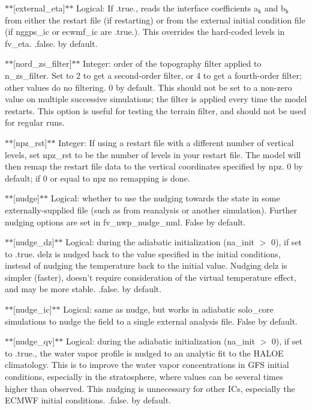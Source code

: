 $\ast$$\ast$\mbox{[}external\-\_\-eta\mbox{]}$\ast$$\ast$ Logical\-: If .true., reads the interface coefficients a$_{\mbox{k}}$  and b$_{\mbox{k}}$  from either the restart file (if restarting) or from the external initial condition file (if nggps\-\_\-ic or ecwmf\-\_\-ic are .true.). This overrides the hard-\/coded levels in fv\-\_\-eta. .false. by default.

$\ast$$\ast$\mbox{[}nord\-\_\-zs\-\_\-filter\mbox{]}$\ast$$\ast$ Integer\-: order of the topography filter applied to n\-\_\-zs\-\_\-filter. Set to 2 to get a second-\/order filter, or 4 to get a fourth-\/order filter; other values do no filtering. 0 by default. This should not be set to a non-\/zero value on multiple successive simulations; the filter is applied every time the model restarts. This option is useful for testing the terrain filter, and should not be used for regular runs.

$\ast$$\ast$\mbox{[}npz\-\_\-rst\mbox{]}$\ast$$\ast$ Integer\-: If using a restart file with a different number of vertical levels, set npz\-\_\-rst to be the number of levels in your restart file. The model will then remap the restart file data to the vertical coordinates specified by npz. 0 by default; if 0 or equal to npz no remapping is done.

$\ast$$\ast$\mbox{[}nudge\mbox{]}$\ast$$\ast$ Logical\-: whether to use the nudging towards the state in some externally-\/supplied file (such as from reanalysis or another simulation). Further nudging options are set in fv\-\_\-nwp\-\_\-nudge\-\_\-nml. False by default.

$\ast$$\ast$\mbox{[}nudge\-\_\-dz\mbox{]}$\ast$$\ast$ Logical\-: during the adiabatic initialization (na\-\_\-init $>$ 0), if set to .true. delz is nudged back to the value specified in the initial conditions, instead of nudging the temperature back to the initial value. Nudging delz is simpler (faster), doesn't require consideration of the virtual temperature effect, and may be more stable. .false. by default.

$\ast$$\ast$\mbox{[}nudge\-\_\-ic\mbox{]}$\ast$$\ast$ Logical\-: same as nudge, but works in adiabatic solo\-\_\-core simulations to nudge the field to a single external analysis file. False by default.

$\ast$$\ast$\mbox{[}nudge\-\_\-qv\mbox{]}$\ast$$\ast$ Logical\-: during the adiabatic initialization (na\-\_\-init $>$ 0), if set to .true., the water vapor profile is nudged to an analytic fit to the H\-A\-L\-O\-E climatology. This is to improve the water vapor concentrations in G\-F\-S initial conditions, especially in the stratosphere, where values can be several times higher than observed. This nudging is unnecessary for other I\-Cs, especially the E\-C\-M\-W\-F initial conditions. .false. by default.

